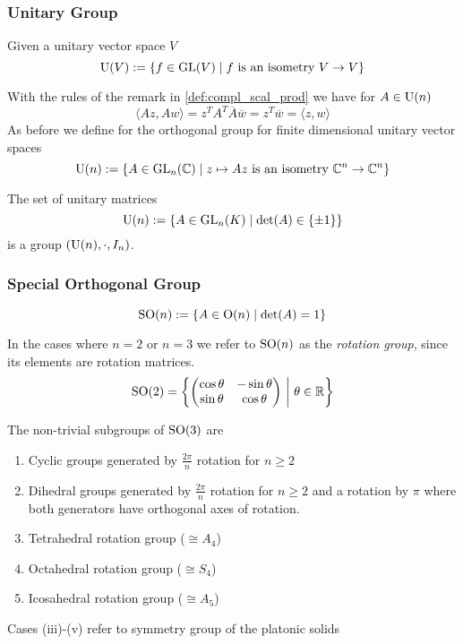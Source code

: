 \subsubsection{Unitary Group}
\begin{proposition}
   Given a unitary vector space \(V\)
   \[\operatorname{U}(V) := \{f \in \operatorname{GL}(V) \mid f~\text{is an isometry}~V \to V\}\]
\end{proposition}
With the rules of the remark in \cref{def:compl_scal_prod} we have for \(A \in \operatorname{U}(n)\)
\[\langle Az, Aw\rangle = z^TA^T\overline{A}\overline{w} = z^T \overline{w} = \langle z, w\rangle\]
As before we define for the orthogonal group for finite dimensional unitary vector spaces
\[\operatorname{U}(n) := \{A \in \operatorname{GL}_n(\mathbb{C}) \mid z \mapsto Az~\text{is an isometry}~\mathbb{C}^n \to \mathbb{C}^n\}\]
\begin{proposition}
   The set of unitary matrices
   \[\operatorname{U}(n) := \{A \in \operatorname{GL}_n(K) \mid \det(A) \in \{\pm 1\}\}\]
   is a group \((\operatorname{U}(n), \cdot, I_n)\).
\end{proposition}

\subsubsection{Special Orthogonal Group}
\begin{proposition}
   \[\operatorname{SO}(n) := \{A \in \operatorname{O}(n) \mid \det(A) = 1\}\]
\end{proposition}
\begin{remark}[Terminology]
   In the cases where \(n = 2\) or \(n = 3\) we refer to \(\operatorname{SO}(n)\) as the \emph{rotation group}, since its elements are rotation matrices.
   \[\operatorname{SO}(2) = \left\{\begin{pmatrix}\cos\theta & -\sin\theta\\ \sin\theta & \cos\theta\end{pmatrix} ~\middle|~ \theta \in \mathbb{R}\right\}\]
\end{remark}

\begin{theorem}
   The non-trivial subgroups of \(\operatorname{SO}(3)\) are
   \begin{enumerate}[label=\roman*, align=Center]
      \item Cyclic groups generated by \(\frac{2\pi}{n}\) rotation for \(n \geq 2\)
      \item Dihedral groups generated by \(\frac{2\pi}{n}\) rotation for \(n \geq 2\) and a rotation by \(\pi\) where both generators have orthogonal axes of rotation.
      \item Tetrahedral rotation group (\(\cong A_4\))
      \item Octahedral rotation group (\(\cong S_4\))
      \item Icosahedral rotation group (\(\cong A_5\))
   \end{enumerate}
\end{theorem}
\begin{remark}
   Cases (iii)-(v) refer to symmetry group of the platonic solids
\end{remark}


